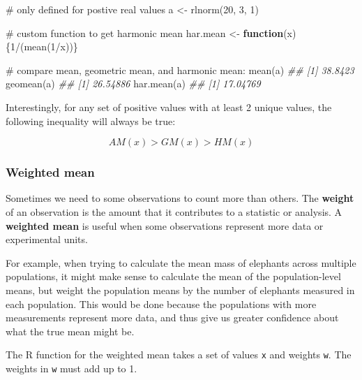 \documentclass[
  13,
  letterpaper,
]{report}
\newenvironment{Shaded}{\begin{snugshade}}{\end{snugshade}}
\newcommand{\CommentTok}[1]{\textcolor[rgb]{0.37,0.37,0.37}{#1}}
\newcommand{\ControlFlowTok}[1]{\textcolor[rgb]{0.00,0.23,0.31}{\textbf{#1}}}
\newcommand{\DecValTok}[1]{\textcolor[rgb]{0.68,0.00,0.00}{#1}}
\newcommand{\DocumentationTok}[1]{\textcolor[rgb]{0.37,0.37,0.37}{\textit{#1}}}
\newcommand{\FunctionTok}[1]{\textcolor[rgb]{0.28,0.35,0.67}{#1}}
\newcommand{\NormalTok}[1]{\textcolor[rgb]{0.00,0.23,0.31}{#1}}
\newcommand{\OtherTok}[1]{\textcolor[rgb]{0.00,0.23,0.31}{#1}}
\newcommand{\SpecialCharTok}[1]{\textcolor[rgb]{0.37,0.37,0.37}{#1}}
\begin{document}
\begin{Shaded}
\begin{Highlighting}[]

\CommentTok{\# only defined for postive real values}
\NormalTok{a }\OtherTok{\textless{}{-}} \FunctionTok{rlnorm}\NormalTok{(}\DecValTok{20}\NormalTok{, }\DecValTok{3}\NormalTok{, }\DecValTok{1}\NormalTok{)}

\CommentTok{\# custom function to get harmonic mean}
\NormalTok{har.mean }\OtherTok{\textless{}{-}} \ControlFlowTok{function}\NormalTok{(x)\{}\DecValTok{1}\SpecialCharTok{/}\NormalTok{(}\FunctionTok{mean}\NormalTok{(}\DecValTok{1}\SpecialCharTok{/}\NormalTok{x))\}}

\CommentTok{\# compare mean, geometric mean, and harmonic mean:}
\FunctionTok{mean}\NormalTok{(a)}
\DocumentationTok{\#\# [1] 38.8423}
\FunctionTok{geomean}\NormalTok{(a)}
\DocumentationTok{\#\# [1] 26.54886}
\FunctionTok{har.mean}\NormalTok{(a)}
\DocumentationTok{\#\# [1] 17.04769}
\end{Highlighting}
\end{Shaded}

Interestingly, for any set of positive values with at least 2 unique
values, the following inequality will always be true:

\[AM\left(x\right)>GM\left(x\right)>HM\left(x\right)\]

\subsubsection{Weighted mean}\label{sec-desc-cen-mean-wm}

Sometimes we need to some observations to count more than others. The
\textbf{weight} of an observation is the amount that it contributes to a
statistic or analysis. A \textbf{weighted mean} is useful when some
observations represent more data or experimental units.

For example, when trying to calculate the mean mass of elephants across
multiple populations, it might make sense to calculate the mean of the
population-level means, but weight the population means by the number of
elephants measured in each population. This would be done because the
populations with more measurements represent more data, and thus give us
greater confidence about what the true mean might be.

The R function for the weighted mean takes a set of values \texttt{x}
and weights \texttt{w}. The weights in \texttt{w} must add up to 1.
\end{document}
